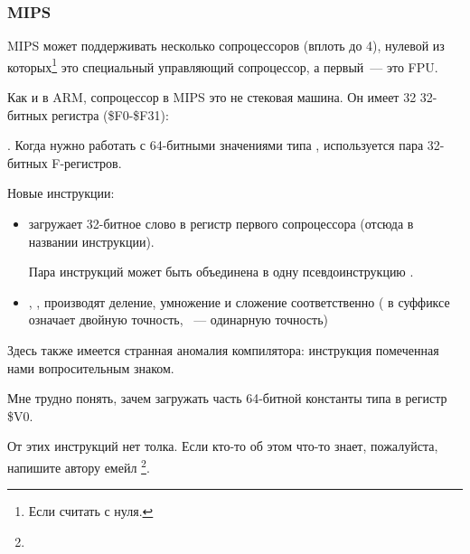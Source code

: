 \subsubsection{MIPS}

MIPS может поддерживать несколько сопроцессоров (вплоть до 4), нулевой из которых\footnote{Если считать с нуля.} это специальный
управляющий сопроцессор, а первый~--- это FPU.

Как и в ARM, сопроцессор в MIPS это не стековая машина. Он имеет 32 32-битных регистра (\$F0-\$F31):

.
Когда нужно работать с 64-битными значениями типа \Tdouble, используется пара 32-битных F-регистров.



Новые инструкции:

\begin{itemize}

\item {} загружает 32-битное слово в регистр первого сопроцессора (отсюда  в названии инструкции).

Пара инструкций  может быть объединена в одну псевдоинструкцию .

\item {}, ,  производят деление, умножение и сложение соответственно 
( в суффиксе означает двойную точность, ~--- одинарную точность)

\end{itemize}

\myindex{\CompilerAnomaly}
\label{MIPS_FPU_LUI}
Здесь также имеется странная аномалия компилятора: инструкция  помеченная нами вопросительным знаком.%

Мне трудно понять, зачем загружать часть 64-битной константы типа \Tdouble в регистр \$V0.

От этих инструкций нет толка.
Если кто-то об этом что-то знает, пожалуйста, напишите автору емейл \footnote{\EMAIL}.

